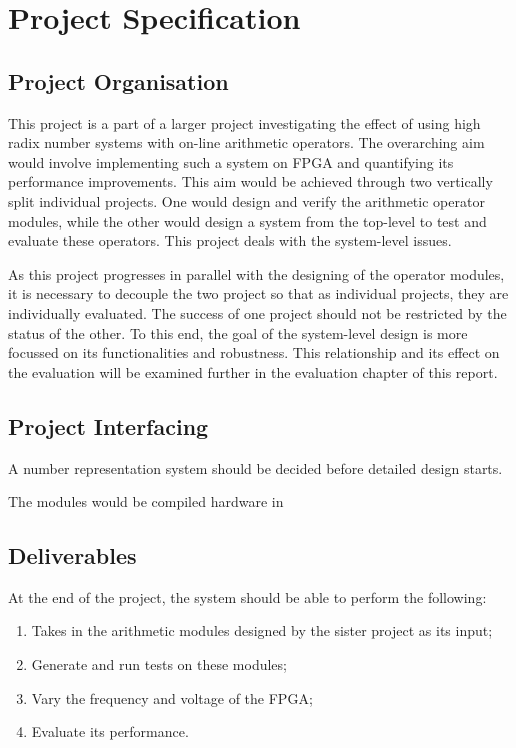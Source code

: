 \documentclass[journal]{IEEEtran}
\begin{document}
\section{Project Specification}

\subsection{Project Organisation}
This project is a part of a larger project investigating the effect of using
high radix number systems with on-line arithmetic operators.
The overarching aim would involve implementing such a system on FPGA and
quantifying its performance improvements.
This aim would be achieved through two vertically split individual projects.
One would design and verify the arithmetic operator modules,
while the other would design a system from the top-level to test and
evaluate these operators.
This project deals with the system-level issues.

As this project progresses in parallel with the designing of the operator
modules, it is necessary to decouple the two project so that as individual
projects, they are individually evaluated.
The success of one project should not be restricted by the status of the other.
To this end, the goal of the system-level design is more focussed on its
functionalities and robustness.
This relationship and its effect on the evaluation will be examined further in
the evaluation chapter of this report.

\subsection{Project Interfacing}
A number representation system should be decided before detailed design starts.

The modules would be compiled hardware in 

\subsection{Deliverables}
At the end of the project, the system should be able to perform the following:
\begin{enumerate}
  \item Takes in the arithmetic modules designed by the sister project as its
        input;
  \item Generate and run tests on these modules;
  \item Vary the frequency and voltage of the FPGA;
  \item Evaluate its performance.
\end{enumerate}
\end{document}

